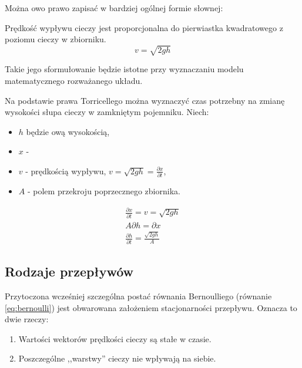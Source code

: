 Można owo prawo zapisać w bardziej ogólnej formie słownej:

\begin{torricelli}
    Prędkość wypływu cieczy jest proporcjonalna do pierwiastka kwadratowego z poziomu cieczy w zbiorniku.
    \begin{equation}\label{eq:torricelli}
    v = \sqrt{2gh}
    \end{equation}
\end{torricelli}

Takie jego sformułowanie będzie istotne przy wyznaczaniu modelu matematycznego rozważanego układu.

Na podstawie prawa Torricellego można wyznaczyć czas potrzebny na zmianę wysokości słupa cieczy w zamkniętym pojemniku. Niech:
\begin{itemize}
    \item $h$ będzie ową wysokością,
    \item $x$ -  
    \item $v$ - prędkością wypływu, $v = \sqrt{2gh} = \frac{\partial x}{\partial t}$,
    \item $A$ - polem przekroju poprzecznego zbiornika.
\end{itemize}

\begin{equation}
    \begin{array}{lr}
        \frac{\partial x}{\partial t} = v = \sqrt{2gh} \\
        A \partial h = \partial x \\
        \frac{\partial h}{\partial t} = \frac{\sqrt{2gh}}{A}
    \end{array}
\end{equation}



\subsection{Rodzaje przepływów}
\label{sub:plyny-przeplywy}

Przytoczona wcześniej szczególna postać równania Bernoulliego (równanie \ref{eq:bernoulli}) jest obwarowana założeniem stacjonarności przepływu. Oznacza to dwie rzeczy:
\begin{enumerate}
    \item Wartości wektorów prędkości cieczy są stałe w czasie.
    \item Poszczególne ,,warstwy'' cieczy nie wpływają na siebie.
\end{enumerate}

